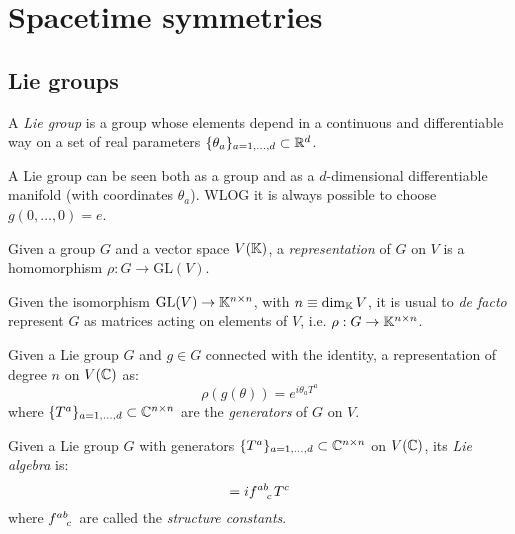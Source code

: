 \section{Spacetime symmetries}

\subsection{Lie groups}

\begin{definition}
  A \textit{Lie group} is a group whose elements depend in a continuous and differentiable way on a set of real parameters $ \{\theta_a\}_{a = 1, \dots, d} \subset \mathbb{R}^d $.
\end{definition}

A Lie group can be seen both as a group and as a $ d $-dimensional differentiable manifold (with coordinates $ \theta_a $). WLOG it is always possible to choose $ g(0,\dots,0) = e $.

\begin{definition}
  Given a group $ G $ and a vector space $ V(\mathbb{K}) $, a \textit{representation} of $ G $ on $ V $ is a homomorphism $ \rho : G \rightarrow \mathrm{GL}(V) $.
\end{definition}

Given the isomorphism $ \mathrm{GL}(V) \rightarrow \mathbb{K}^{n \times n} $, with $ n \equiv \dim_{\mathbb{K}} V $, it is usual to \textit{de facto} represent $ G $ as matrices acting on elements of $ V $, i.e. $ \rho : G \rightarrow \mathbb{K}^{n \times n} $.

\begin{proposition}
  Given a Lie group $ G $ and $ g \in G $ connected with the identity, a representation of degree $ n $ on $ V(\mathbb{C}) $ as:
  \begin{equation}
    \rho(g(\theta)) = e^{i \theta_a T^a}
    \label{eq:1.27}
  \end{equation}
  where $ \{T^a\}_{a = 1, \dots, d} \subset \mathbb{C}^{n \times n} $ are the \textit{generators} of $ G $ on $ V $.
\end{proposition}

\begin{definition}
  Given a Lie group $ G $ with generators $ \{T^a\}_{a = 1, \dots, d} \subset \mathbb{C}^{n \times n} $ on $ V(\mathbb{C}) $, its \textit{Lie algebra} is:
  \begin{equation}
    [T^a, T^b] = i \tensor{f}{^a^b_c} T^c
    \label{eq:1.28}
  \end{equation}
  where $ \tensor{f}{^a^b_c} $ are called the \textit{structure constants}.
\end{definition}

